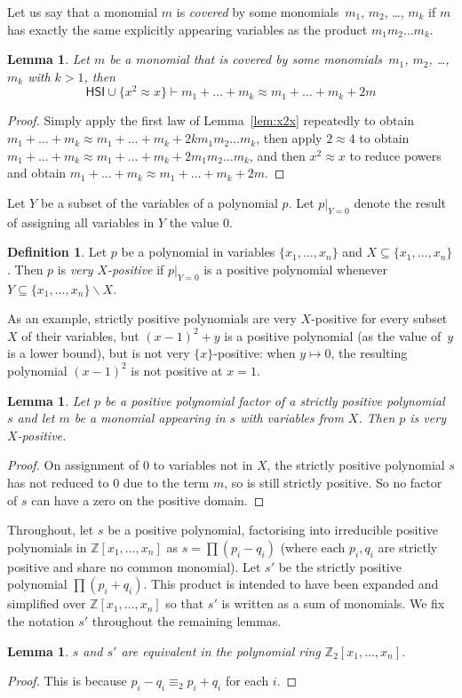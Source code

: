\documentclass[eqnor,reqno]{amsart}
\theoremstyle{plain}
\newtheorem{lem}[thm]{Lemma}
\theoremstyle{definition}
\newtheorem{defn}[thm]{Definition}
\newcommand{\HSI}{\textsf{HSI}}
\begin{document}
Let us say that a monomial $m$ is  \emph{covered} by some monomials~$m_1$, $m_2$, \dots, $m_k$ if $m$ has exactly the same explicitly appearing variables as the product $m_1m_2\dots m_k$.
\begin{lem} \label{lem:cover2}
Let $m$ be a monomial that is covered by some monomials~$m_1$, $m_2$, \dots, $m_k$ with $k>1$, then 
\[
\HSI\cup\{x^2\approx x\}\vdash  m_1+ \dots + m_k \approx  m_1+ \dots + m_k+ 2m
\]
\end{lem}
\begin{proof}
Simply apply the first law of Lemma~\ref{lem:x2x} repeatedly to obtain 
$m_1+ \dots + m_k\approx m_1+ \dots + m_k+2km_1m_2\dots m_k$, then apply $2\approx 4$ to obtain $m_1+ \dots + m_k\approx m_1+ \dots + m_k+2m_1m_2\dots m_k$, and then $x^2\approx x$ to reduce powers and obtain $m_1+ \dots + m_k\approx m_1+ \dots + m_k+2m$.
\end{proof}
  


Let $Y$ be a subset of the variables of a polynomial $p$.  Let $p|_{Y=0}$ denote the result of assigning all variables in $Y$ the value $0$.
\begin{defn}
Let $p$ be a polynomial in variables $\{x_1,\dots,x_n\}$ and $X\subseteq \{x_1,\dots,x_n\}$.  Then $p$ is \emph{very $X$-positive} if $p|_{Y=0}$ is a positive polynomial whenever $Y\subseteq \{x_1,\dots,x_n\}\backslash X$. 
\end{defn}
As an example, strictly positive polynomials are very $X$-positive for every subset $X$ of their variables, but $(x-1)^2+y$ is a positive polynomial (as the value of~$y$ is a lower bound), but is not very $\{x\}$-positive: when $y\mapsto 0$, the resulting polynomial $(x-1)^2$ is not positive at $x=1$.
\begin{lem}
Let $p$ be a positive polynomial factor of a strictly positive polynomial~$s$ and let $m$ be a monomial appearing in $s$ with variables from $X$.  
Then $p$ is very $X$-positive.
\end{lem}
\begin{proof}
On assignment of $0$ to variables not in $X$, the strictly positive polynomial $s$ has not reduced to $0$ due to the term $m$, so is still strictly positive.  
So no factor of $s$ can have a zero on the positive domain.
\end{proof}
Throughout, let $s$ be a positive polynomial, factorising into irreducible positive polynomials in $\mathbb{Z}[x_1,\dots,x_n]$ as $s= \prod(p_i - q_i)$ (where each $p_i,q_i$ are strictly positive and share no common monomial).  Let $s'$ be the strictly positive polynomial  $\prod(p_i + q_i)$.
This product is intended to have been expanded and simplified over $\mathbb{Z}[x_1,\dots,x_n]$ so that $s'$ is written as a sum of monomials.  We fix the notation $s'$ throughout the remaining lemmas.
\begin{lem}\label{lem:ss'}
$s$ and $s'$ are equivalent in the polynomial ring $\mathbb{Z}_2[x_1,\dots,x_n]$.
\end{lem}
\begin{proof}
This is because $p_i - q_i\equiv_2 p_i + q_i$ for each $i$.
\end{proof}
\end{document}
